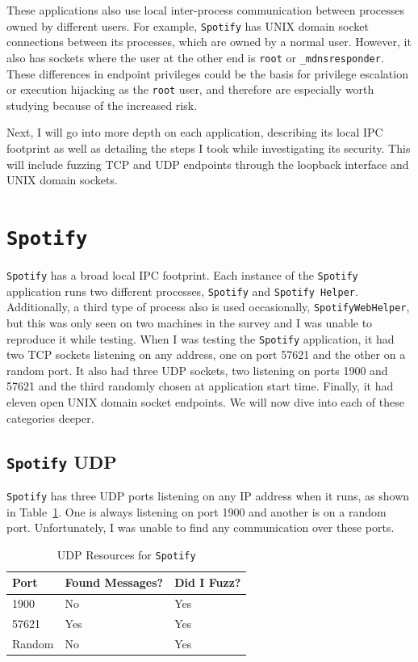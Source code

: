 These applications also use local inter-process communication between processes owned by different users.  For example, \texttt{Spotify} has UNIX domain socket connections between its processes, which are owned by a normal user.  However, it also has sockets where the user at the other end is \texttt{root} or \texttt{\_mdnsresponder}.  These differences in endpoint privileges could be the basis for privilege escalation or execution hijacking as the \texttt{root} user, and therefore are especially worth studying because of the increased risk.

Next, I will go into more depth on each application, describing its local IPC footprint as well as detailing the steps I took while investigating its security.  This will include fuzzing TCP and UDP endpoints through the loopback interface and UNIX domain sockets.

\section{\texttt{Spotify}}
\label{sec:spotify}
\texttt{Spotify} has a broad local IPC footprint.  Each instance of the \texttt{Spotify} application runs two different processes, \texttt{Spotify} and \texttt{Spotify Helper}.  Additionally, a third type of process also is used occasionally, \texttt{SpotifyWebHelper}, but this was only seen on two machines in the survey and I was unable to reproduce it while testing.  When I was testing the \texttt{Spotify} application, it had two TCP sockets listening on any address, one on port 57621 and the other on a random port.  It also had three UDP sockets, two listening on ports 1900 and 57621 and the third randomly chosen at application start time.  Finally, it had eleven open UNIX domain socket endpoints.  We will now dive into each of these categories deeper.

\subsection{\texttt{Spotify} UDP}
\label{sec:spotifyUdp}
\texttt{Spotify} has three UDP ports listening on any IP address when it runs, as shown in Table~\ref{tab:spotifyUdpTab}.  One is always listening on port 1900 and another is on a random port.  Unfortunately, I was unable to find any communication over these ports.

\begin{table}
\centering
\begin{normalsize}
\begin{tabular}{ l | l | l }
\textbf{Port} & \textbf{Found Messages?} & \textbf{Did I Fuzz?} \\ \hline
1900 & No & Yes \\ \hline
57621 & Yes & Yes \\ \hline
Random & No & Yes \\ \hline
\end{tabular}
\caption{UDP Resources for \texttt{Spotify}}
\label{tab:spotifyUdpTab}
\end{normalsize}
\end{table} 

